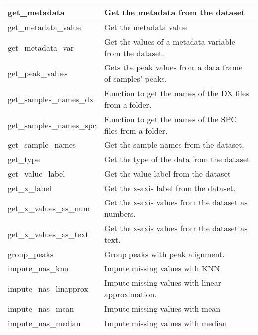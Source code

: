 \begin{scriptsize}
\begin{longtable}{|m{4.3cm}|m{11cm}|}
		\hline
		get\_metadata & Get the metadata from the dataset \\
		
		\hline
		get\_metadata\_value & Get the metadata value \\
		
		\hline
		get\_metadata\_var & Get the values of a metadata variable from the dataset. \\
		
		\hline
		get\_peak\_values & Gets the peak values from a data frame of samples’ peaks. \\
		
		\hline
		get\_samples\_names\_dx & Function to get the names of the DX files from a folder. \\
		
		\hline
		get\_samples\_names\_spc & Function to get the names of the SPC files from a folder. \\
		
		\hline
		get\_sample\_names & Get the sample names from the dataset. \\
		
		\hline
		get\_type & Get the type of the data from the dataset \\
		
		\hline
		get\_value\_label & Get the value label from the dataset \\
		
		\hline
		get\_x\_label & Get the x-axis label from the dataset. \\
		
		\hline
		get\_x\_values\_as\_num & Get the x-axis values from the dataset as numbers. \\
		
		\hline
		get\_x\_values\_as\_text & Get the x-axis values from the dataset as text. \\
		
		\hline
		group\_peaks & Group peaks with peak alignment. \\
		
		\hline
		impute\_nas\_knn & Impute missing values with KNN \\
		
		\hline
		impute\_nas\_linapprox & Impute missing values with linear approximation. \\
		
		\hline
		impute\_nas\_mean & Impute missing values with mean \\
		
		\hline
		impute\_nas\_median & Impute missing values with median \\
		

\end{longtable}
\end{scriptsize}
